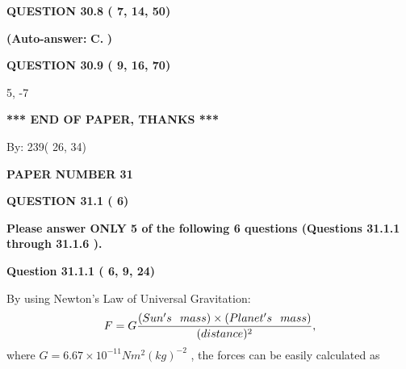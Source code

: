 \documentclass[12pt]{article}
\begin{document}
  
  
{\textbf{\large{QUESTION
30.8 
 (          7,         14,         50)
}}}
 
 
{\textbf{(Auto-answer:}}
{\textbf{\large{
C.}}}
{\textbf{)}}
 
 
  
  
{\textbf{\large{QUESTION
30.9 
 (          9,         16,         70)
}}}

5,  %
-7
 
   
   
   
   
\vspace{1.0in} 
{\textbf{\large{ *** END OF PAPER, THANKS *** }}} 
   
   
\hspace{1.0in} By: 
         239(         26,          34)
   
   
   
   
\newpage 
\setcounter{page}{ 
    31001 } 
   
   
 {\textbf{ \Large{ PAPER NUMBER          31 }}}
   
   
   
   
  
\vspace{0.2in}
  
{\textbf{\Large{QUESTION
31.1 
 (          6)
}}}
  
  
{\textbf{\Large{Please answer ONLY  %
           5 %
 of the following  %
           6 %
 questions (Questions  %
31.1.1 %
 through  %
31.1.6 %
 ). }}}
   
   
  
  
{\textbf{\large{Question
31.1.1 
 (          6,          9,         24)
}}}

By using Newton's Law of Universal Gravitation:
\[
F=G \frac{(Sun's \hspace{0.1in} mass) \times (Planet's \hspace{0.1in} mass)} { (distance)^2},
\]
where
$ G= %
6.67 \times 10^{-11} N m^{2}(kg)^{-2}$ , the forces can be easily calculated as
 
\vspace{0.2in}
 
\end{document}

